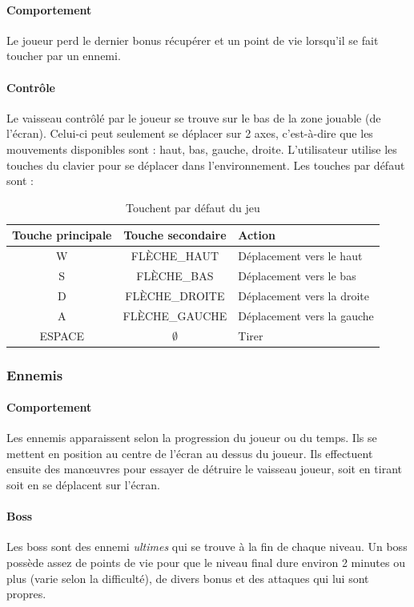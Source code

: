 \documentclass[11pt, a4paper, oneside]{article}
\begin{document}
\paragraph{Comportement}
Le joueur perd le dernier bonus récupérer et un point de vie lorsqu'il se fait toucher par un ennemi.
\paragraph{Contrôle}
Le vaisseau contrôlé par le joueur se trouve sur le bas de la zone jouable (de l'écran). Celui-ci peut seulement se déplacer sur 2 axes, c'est-à-dire que les mouvements disponibles sont : haut, bas, gauche, droite. L'utilisateur utilise les touches du clavier pour se déplacer dans l'environnement. Les touches par défaut sont :
\begin{table}[h]
	\begin{center}
		\begin{tabular}{|c|c|l|}
			\hline
			\textbf{Touche principale} & \textbf{Touche secondaire} & \textbf{Action}\\
			\hline \hline
			W & FLÈCHE\_HAUT & Déplacement vers le haut\\ \hline
			S & FLÈCHE\_BAS & Déplacement vers le bas\\ \hline
			D & FLÈCHE\_DROITE & Déplacement vers la droite\\ \hline
			A & FLÈCHE\_GAUCHE & Déplacement vers la gauche\\ \hline
			ESPACE & $\emptyset$ & Tirer\\
			\hline
		\end{tabular}
		\caption{Touchent par défaut du jeu}
		\label{table:touchesjeu}
	\end{center}
\end{table}
\subsubsection{Ennemis}
\paragraph{Comportement}
Les ennemis apparaissent selon la progression du joueur ou du temps. Ils se mettent en position au centre de l'écran au dessus du joueur. Ils effectuent ensuite des manœuvres pour essayer de détruire le vaisseau joueur, soit en tirant soit en se déplacent sur l'écran.
\paragraph{Boss}
Les boss sont des ennemi \emph{ultimes} qui se trouve à la fin de chaque niveau. Un boss possède assez de points de vie pour que le niveau final dure environ 2 minutes ou plus (varie selon la difficulté), de divers bonus et des attaques qui lui sont propres.
\end{document}

